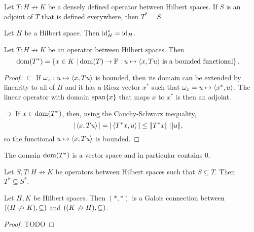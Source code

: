 \begin{lemma} \label{everywhereDefinedAdjointLemma}
Let $T: H\not\to K$ be a densely defined operator between Hilbert spaces. If $S$ is an adjoint of $T$ that is defined everywhere, then $T^* = S$.
\end{lemma}
\begin{corollary}
Let $H$ be a Hilbert space. Then $\operatorname{id}_H^* = \operatorname{id}_H$.
\end{corollary}

\begin{proposition} \label{adjointDomain}
Let $T: H\not\to K$ be an operator between Hilbert spaces. Then
\[ \operatorname{dom}(T^*) = \left\{ x\in K \;\middle|\; \text{$\operatorname{dom}(T)\to \mathbb{F}: u\mapsto \left\langle x, Tu \right\rangle$ is a bounded functional} \right\}. \]
\end{proposition}
\begin{proof}
$\boxed{\subseteq}$ If $\omega_x: u\mapsto \left\langle x, Tu \right\rangle$ is bounded, then its domain can be extended by linearity to all of $H$ and it has a Riesz vector $x^*$ such that $\omega_x = u\mapsto \left\langle x^*, u \right\rangle$. The linear operator with domain $\operatorname{span}\{x\}$ that maps $x$ to $x^*$ is then an adjoint.

$\boxed{\supseteq}$ If $x\in\operatorname{dom}(T^*)$, then, using the Cauchy-Schwarz inequality,
\[ |\left\langle x,Tu \right\rangle| = |\left\langle T^*x,u \right\rangle| \leq \lVert T^*x\rVert\;\lVert u\rVert, \]
so the functional $u\mapsto \left\langle x, Tu \right\rangle$ is bounded.
\end{proof}
\begin{corollary}
The domain $\operatorname{dom}(T^*)$ is a vector space and in particular contains $0$.
\end{corollary}
\begin{corollary} \label{HilbertAdjointAntitone}
Let $S,T: H\not\to K$ be operators between Hilbert spaces such that $S\subseteq T$. Then $T^* \subseteq S^*$.
\end{corollary}
\begin{corollary}
Let $H, K$ be Hilbert spaces. Then $(*,*)$ is a Galois connection between $\left( (H\not\to K), \subseteq \right)$ and $\left( (K\not\to H), \subseteq \right)$.
\end{corollary}
\begin{proof}
TODO
\end{proof}

